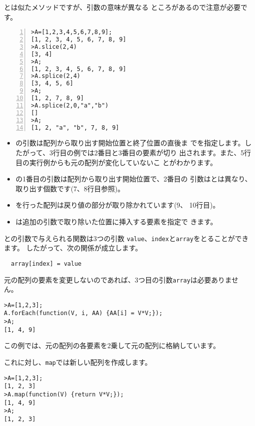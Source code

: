 とは似たメソッドですが、引数の意味が異なる
ところがあるので注意が必要です。
\begin{Verbatim}[numbers=left,firstnumber=1, numbersep=6pt]
>A=[1,2,3,4,5,6,7,8,9];
[1, 2, 3, 4, 5, 6, 7, 8, 9]
>A.slice(2,4)
[3, 4]
>A;
[1, 2, 3, 4, 5, 6, 7, 8, 9]
>A.splice(2,4)
[3, 4, 5, 6]
>A;
[1, 2, 7, 8, 9]
>A.splice(2,0,"a","b")
[]
>A;
[1, 2, "a", "b", 7, 8, 9]
\end{Verbatim}
\begin{itemize}
  \item {}の引数は配列から取り出す開始位置と終了位置の直後ま
        でを指定します。したがって、3行目の例では2番目と3番目の要素が切り
        出されます。また、5行目の実行例からも元の配列が変化していないこ
        とがわかります。
  \item {}の1番目の引数は配列から取り出す開始位置で、2番目の
        引数はとは異なり、取り出す個数です(7、8行目参照)。
 \item {}を行った配列は戻り値の部分が取り除かれています(9、
       10行目)。
 \item {}は追加の引数で取り除いた位置に挿入する要素を指定で
       きます。
 \end{itemize}
 との引数で与えられる関数は3つの引数
       \verb+value+、\verb+index+と\verb+array+をとることができます。
したがって、次の関係が成立します。
\begin{Verbatim}
  array[index] = value
\end{Verbatim}
%
元の配列の要素を変更しないのであれば、3つ目の引数\verb+array+は必要ありません。

\begin{Verbatim}
>A=[1,2,3];
A.forEach(function(V, i, AA) {AA[i] = V*V;});
>A;
[1, 4, 9]
\end{Verbatim}
この例では、元の配列の各要素を2乗して元の配列に格納しています。

これに対し、\verb+map+では新しい配列を作成します。
\begin{Verbatim}
>A=[1,2,3];
[1, 2, 3]
>A.map(function(V) {return V*V;});
[1, 4, 9]
>A;
[1, 2, 3]
\end{Verbatim}

